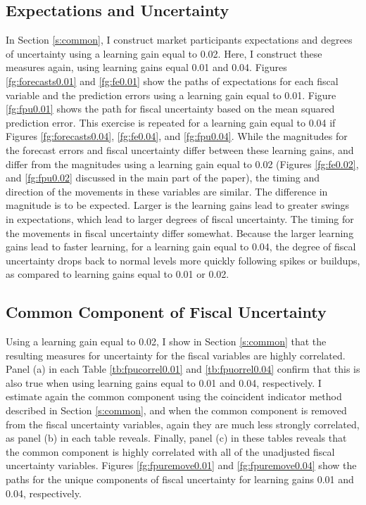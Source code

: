 \documentclass[11pt]{article}
\begin{document}
\subsection{Expectations and Uncertainty}
In Section \ref{s:common}, I construct market participants expectations and degrees of uncertainty using a learning gain equal to 0.02.  Here, I construct these measures again, using learning gains equal 0.01 and 0.04.  Figures \ref{fg:forecasts0.01} and \ref{fg:fe0.01} show the paths of expectations for each fiscal variable and the prediction errors using a learning gain equal to 0.01.  Figure \ref{fg:fpu0.01} shows the path for fiscal uncertainty based on the mean squared prediction error.  This exercise is repeated for a learning gain equal to 0.04 if Figures \ref{fg:forecasts0.04}, \ref{fg:fe0.04}, and \ref{fg:fpu0.04}.  While the magnitudes for the forecast errors and fiscal uncertainty differ between these learning gains, and differ from the magnitudes using a learning gain equal to 0.02 (Figures \ref{fg:fe0.02}, and \ref{fg:fpu0.02} discussed in the main part of the paper), the timing and direction of the movements in these variables are similar.  The difference in magnitude is to be expected.  Larger is the learning gains lead to greater swings in expectations, which lead to larger degrees of fiscal uncertainty.  The timing for the movements in fiscal uncertainty differ somewhat.  Because the larger learning gains lead to faster learning, for a learning gain equal to 0.04, the degree of fiscal uncertainty drops back to normal levels more quickly following spikes or buildups, as compared to learning gains equal to 0.01 or 0.02.

\subsection{Common Component of Fiscal Uncertainty}

Using a learning gain equal to 0.02, I show in Section \ref{s:common} that the resulting measures for uncertainty for the fiscal variables are highly correlated.  Panel (a) in each Table \ref{tb:fpucorrel0.01} and \ref{tb:fpuorrel0.04} confirm that this is also true when using learning gains equal to 0.01 and 0.04, respectively.  I estimate again the common component using the coincident indicator method described in Section \ref{s:common}, and when the common component is removed from the fiscal uncertainty variables, again they are much less strongly correlated, as panel (b) in each table reveals.  Finally, panel (c) in these tables reveals that the common component is highly correlated with all of the unadjusted fiscal uncertainty variables.  Figures \ref{fg:fpuremove0.01} and \ref{fg:fpuremove0.04} show the paths for the unique components of fiscal uncertainty for learning gains 0.01 and 0.04, respectively.
\end{document}
